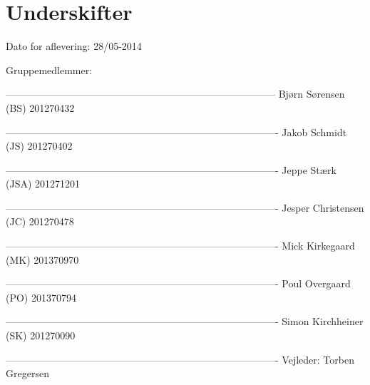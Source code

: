 \chapter*{Underskifter}

Dato for aflevering: 28/05-2014

Gruppemedlemmer:


--------------------------------------------------------------------------------- \newline
Bjørn Sørensen (BS) 201270432\newline


----------------------------------------------------------------------------------\newline
Jakob Schmidt (JS) 201270402\newline


----------------------------------------------------------------------------------\newline
Jeppe Stærk (JSA) 201271201\newline


----------------------------------------------------------------------------------\newline
Jesper Christensen (JC) 201270478\newline


----------------------------------------------------------------------------------\newline
Mick Kirkegaard (MK) 201370970\newline


----------------------------------------------------------------------------------\newline
Poul Overgaard (PO) 201370794\newline


----------------------------------------------------------------------------------\newline
Simon Kirchheiner (SK) 201270090\newline









----------------------------------------------------------------------------------\newline
Vejleder: Torben Gregersen\newline
